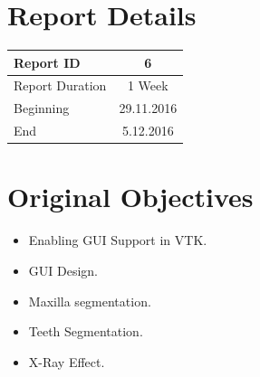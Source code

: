 \documentclass[12pt, b5paper]{article}
\begin{document}
\title{\rmfamily\normalfont{}}

\author{{\small Automatic Mandible Segmentation Using VTK}}

\date{\footnotesize{\today}}

\maketitle

% 
 


\section{Report Details}
\begin{center}
\begin{tabular}{ l | c }
\hline 
Report ID & 6  \\ %
\hline 
Report Duration & 1 Week \\ %
\hline 
Beginning & 29.11.2016 \\ %
\hline 
End & 5.12.2016 \\ %
\hline 
\end{tabular}
\end{center}

\section{Original Objectives}
\begin{itemize}
\item Enabling GUI Support in VTK.
\item GUI Design.
\item Maxilla segmentation.
\item Teeth Segmentation.
\item X-Ray Effect.
\end{itemize}
\end{document}
